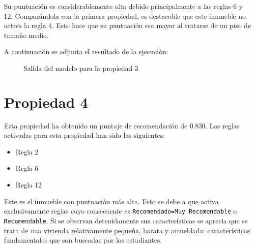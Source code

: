 \documentclass[12pt]{report} %
\begin{document}
    Su puntuación es considerablemente alta debido principalmente a las reglas
    6 y 12. Comparándola con la primera propiedad, es destacable que este
    inmueble no activa la regla 4. Esto hace que su puntuación sea mayor al
    tratarse de un piso de tamaño medio.

    A continuación se adjunta el resultado de la ejecución:
    \begin{figure}[H]
        \centering
        \caption{Salida del modelo para la propiedad 3}
    \end{figure}

    \section{Propiedad 4}
    Esta propiedad ha obtenido un puntaje de recomendación de $0.830$. Las reglas activadas para esta propiedad han sido las siguientes: 
    \begin{itemize}
        \item Regla 2
        \item Regla 6
        \item Regla 12
    \end{itemize}
    
    Este es el inmueble con puntuación más alta. Esto se debe a que activa
    exclusivamente reglas cuyo consecuente es \texttt{Recomendado=Muy
    Recomendable} o \texttt{Recomendable}. Si se observan detenidamente sus
    características se aprecia que se trata de una vivienda relativamente
    pequeña, barata y amueblada; características fundamentales que son buscadas
    por los estudiantes.
\end{document}
